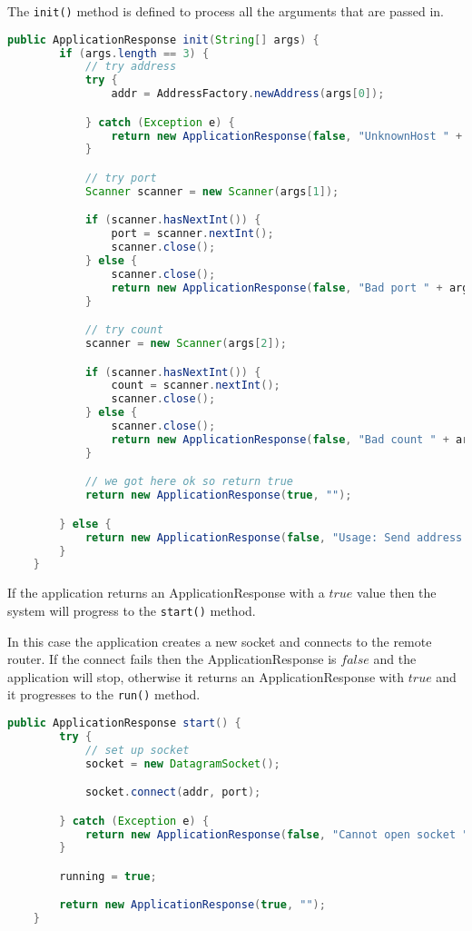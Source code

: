 \noindent  The \texttt{init()} method is defined to process all the
arguments that are passed in.

\begin{lstlisting}[language=java,frame=single]
    public ApplicationResponse init(String[] args) {
        if (args.length == 3) {
            // try address
            try {
                addr = AddressFactory.newAddress(args[0]);

            } catch (Exception e) {
                return new ApplicationResponse(false, "UnknownHost " + args[0]);
            }

            // try port
            Scanner scanner = new Scanner(args[1]);

            if (scanner.hasNextInt()) {
                port = scanner.nextInt();
                scanner.close();
            } else {
            	scanner.close();
                return new ApplicationResponse(false, "Bad port " + args[1]);
            }

            // try count
            scanner = new Scanner(args[2]);

            if (scanner.hasNextInt()) {
                count = scanner.nextInt();
                scanner.close();
            } else {
            	scanner.close();
                return new ApplicationResponse(false, "Bad count " + args[2]);
            }

            // we got here ok so return true
            return new ApplicationResponse(true, "");

        } else {
            return new ApplicationResponse(false, "Usage: Send address port count");
        }
    }
\end{lstlisting}

\noindent If the application returns an ApplicationResponse with a
$true$ value then the system will progress to the \texttt{start()}
method.

In this case the application creates a new socket and connects to the
remote router. If the connect fails then the ApplicationResponse is
$false$ and the application will stop, otherwise it returns an
ApplicationResponse with $true$ and it progresses to the
\texttt{run()} method.

\begin{lstlisting}[language=java,frame=single]
    public ApplicationResponse start() {
        try {
            // set up socket
            socket = new DatagramSocket();

            socket.connect(addr, port);

        } catch (Exception e) {
            return new ApplicationResponse(false, "Cannot open socket " + e.getMessage());
        }

        running = true;

        return new ApplicationResponse(true, "");
    }
\end{lstlisting}

